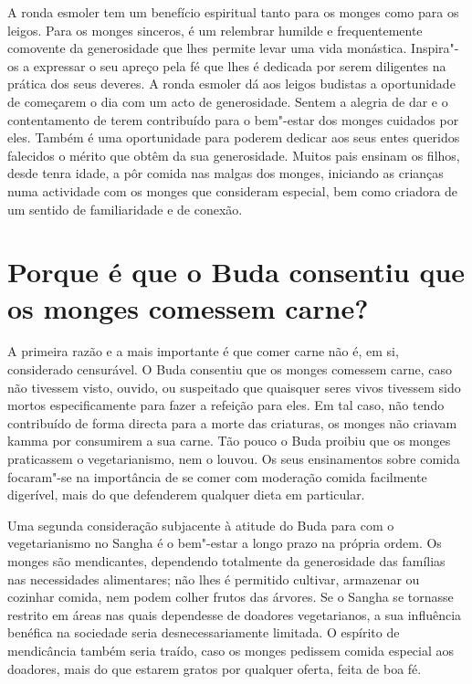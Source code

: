 A ronda esmoler tem um benefício espiritual tanto para os monges como
para os leigos. Para os monges sinceros, é um relembrar humilde e
frequentemente comovente da generosidade que lhes permite levar uma vida
monástica. Inspira"-os a expressar o seu apreço pela fé que lhes é
dedicada por serem diligentes na prática dos seus deveres. A ronda
esmoler dá aos leigos budistas a oportunidade de começarem o dia com um
acto de generosidade. Sentem a alegria de dar e o contentamento de terem
contribuído para o bem"-estar dos monges cuidados por eles. Também é uma
oportunidade para poderem dedicar aos seus entes queridos falecidos o
mérito que obtêm da sua generosidade. Muitos pais ensinam os filhos,
desde tenra idade, a pôr comida nas malgas dos monges, iniciando as
crianças numa actividade com os monges que consideram especial, bem como
criadora de um sentido de familiaridade e de conexão.

\section{Porque é que o Buda consentiu que os monges comessem carne?}

A primeira razão e a mais importante é que comer carne não é, em si,
considerado censurável. O Buda consentiu que os monges comessem carne,
caso não tivessem visto, ouvido, ou suspeitado que quaisquer seres vivos
tivessem sido mortos especificamente para fazer a refeição para eles. Em
tal caso, não tendo contribuído de forma directa para a morte das
criaturas, os monges não criavam kamma por consumirem a sua carne. Tão
pouco o Buda proibiu que os monges praticassem o vegetarianismo, nem o
louvou. Os seus ensinamentos sobre comida focaram"-se na importância de
se comer com moderação comida facilmente digerível, mais do que
defenderem qualquer dieta em particular.

Uma segunda consideração subjacente à atitude do Buda para com o
vegetarianismo no Sangha é o bem"-estar a longo prazo na própria ordem.
Os monges são mendicantes, dependendo totalmente da generosidade das
famílias nas necessidades alimentares; não lhes é permitido cultivar,
armazenar ou cozinhar comida, nem podem colher frutos das árvores. Se o
Sangha se tornasse restrito em áreas nas quais dependesse de doadores
vegetarianos, a sua influência benéfica na sociedade seria
desnecessariamente limitada. O espírito de mendicância também seria
traído, caso os monges pedissem comida especial aos doadores, mais do
que estarem gratos por qualquer oferta, feita de boa fé.


